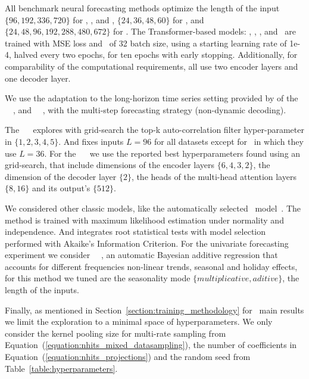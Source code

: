 
All benchmark neural forecasting methods optimize the length of the input $\{96,192,336,720\}$ for \ETT, \Weather, and \Electricity, $\{24,36,48,60\}$ for \ILI, and $\{24,48,96,192,288,480,672\}$ for \ETTm. The Transformer-based models: \Autoformer, \Informer, \LogTrans, and \Reformer\ are trained with MSE loss and \ADAM\ of 32 batch size, using a starting learning rate of 1e-4, halved every two epochs, for ten epochs with early stopping. Additionally, for comparability of the computational requirements, all use two encoder layers and one decoder layer.

We use the adaptation to the long-horizon time series setting provided by \citealt{wu2021autoformer} of the \Reformer\ ~\citep{kitaev2020reformer}, and \LogTrans\ ~\citep{li2019logtrans}, with the multi-step forecasting strategy (non-dynamic decoding).

The \Autoformer\ ~\citep{wu2021autoformer} explores with grid-search the top-k auto-correlation filter hyper-parameter in $\{1,2,3,4,5\}$. And fixes inputs $L=96$ for all datasets except for \ILI\ in which they use $L=36$. For the \Informer\ ~\citep{zhou2021informer} we use the reported best hyperparameters found using an grid-search, that include dimensions of the encoder layers $\{6,4,3,2\}$, the dimension of the decoder layer $\{2\}$, the heads of the multi-head attention layers $\{8,16\}$ and its output's $\{512\}$.


We considered other classic models, like the automatically selected \ARIMA\ model~\citep{hyndman2008automatic_arima}. The method is trained with maximum likelihood estimation under normality and independence. And integrates root statistical tests with model selection performed with Akaike's Information Criterion. For the univariate forecasting experiment we consider \Prophet\ ~\citep{taylor2018facebook_prophet}, an automatic Bayesian additive regression that accounts for different frequencies non-linear trends, seasonal and holiday effects, for this method we tuned are the seasonality mode $\{multiplicative, aditive\}$, the length of the inputs.

Finally, as mentioned in Section~\ref{section:training_methodology} for \ours\ main results we limit the exploration to a minimal space of hyperparameters. We only consider the kernel pooling size for multi-rate sampling from Equation~(\ref{equation:nhits_mixed_datasampling}), the number of coefficients in Equation~(\ref{equation:nhits_projections}) and the random seed from Table~\ref{table:hyperparameters}.

%

